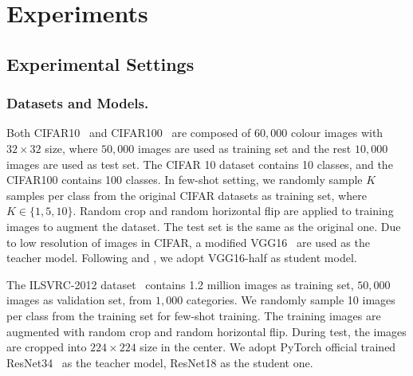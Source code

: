 \documentclass[letterpaper]{article} %
\begin{document}
\section{Experiments}
{
    \subsection{Experimental Settings}
    {
        \subsubsection{Datasets and Models.}
        {
            Both CIFAR10~\cite{krizhevsky2009learning} and CIFAR100~\cite{krizhevsky2009learning} are composed of $60,000$ colour images with $32 \times 32$ size, where $50,000$ images are used as training set and the rest $10,000$ images are used as test set.
            The CIFAR 10 dataset contains 10 classes, and the CIFAR100 contains 100 classes.
            In few-shot setting, we randomly sample $K$ samples per class from the original CIFAR datasets as training set, where $K \in \{1, 5, 10\}$.
            Random crop and random horizontal flip are applied to training images to augment the dataset.
            The test set is the same as the original one.
            Due to low resolution of images in CIFAR, a modified VGG16~\cite{li2016pruning} are used as the teacher model.
            Following \cite{li2018few} and \cite{li2016pruning}, we adopt VGG16-half as student model.

            The ILSVRC-2012 dataset~\cite{ILSVRC15} contains 1.2 million images as training set, $50,000$ images as validation set, from $1,000$ categories.
            We randomly sample 10 images per class from the training set for few-shot training.
            The training images are augmented with random crop and random horizontal flip.
            During test, the images are cropped into $224 \times 224$ size in the center.
            We adopt PyTorch official trained ResNet34~\cite{he2016deep}
            as the teacher model, ResNet18 as the student one.

        }

}}
\end{document}
